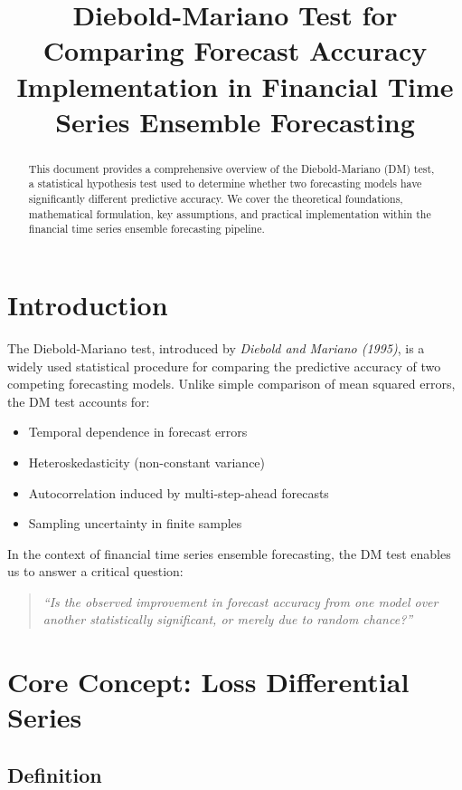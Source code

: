 \documentclass[11pt,a4paper]{article}
\title{\textbf{Diebold-Mariano Test for Comparing Forecast Accuracy}\\
\large{Implementation in Financial Time Series Ensemble Forecasting}}
\author{}
\date{}
\begin{document}
\maketitle

\begin{abstract}
This document provides a comprehensive overview of the Diebold-Mariano (DM) test, a statistical hypothesis test used to determine whether two forecasting models have significantly different predictive accuracy. We cover the theoretical foundations, mathematical formulation, key assumptions, and practical implementation within the financial time series ensemble forecasting pipeline.
\end{abstract}

\tableofcontents
\newpage

\section{Introduction}

The Diebold-Mariano test, introduced by \textit{Diebold and Mariano (1995)}, is a widely used statistical procedure for comparing the predictive accuracy of two competing forecasting models. Unlike simple comparison of mean squared errors, the DM test accounts for:

\begin{itemize}
    \item Temporal dependence in forecast errors
    \item Heteroskedasticity (non-constant variance)
    \item Autocorrelation induced by multi-step-ahead forecasts
    \item Sampling uncertainty in finite samples
\end{itemize}

In the context of financial time series ensemble forecasting, the DM test enables us to answer a critical question:

\begin{quote}
\textit{``Is the observed improvement in forecast accuracy from one model over another statistically significant, or merely due to random chance?''}
\end{quote}

\section{Core Concept: Loss Differential Series}

\subsection{Definition}
\end{document}
